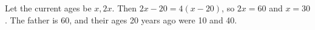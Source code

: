 Let the current ages be $x,2x$. Then $2x-20=4(x-20)$, so $2x=60$ and $\boxed{x=30}$. The father is 60, and their ages 20 years ago were 10 and 40.
